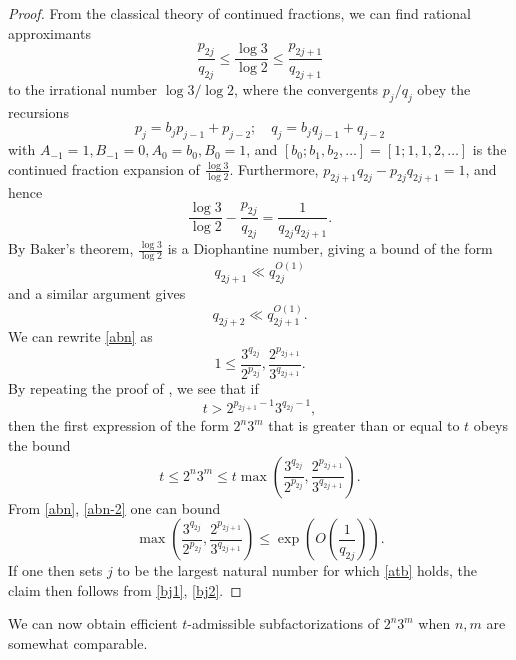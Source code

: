 \documentclass[12pt,a4paper,reqno]{amsart}
\numberwithin{equation}{section}
\theoremstyle{plain}
\theoremstyle{definition}
\begin{document}
\begin{proof}  From the classical theory of continued fractions, we can find rational approximants
\begin{equation}\label{abn}
 \frac{p_{2j}}{q_{2j}} \leq \frac{\log 3}{\log 2} \leq \frac{p_{2j+1}}{q_{2j+1}}
\end{equation}
to the irrational number $\log 3/\log 2$, where the convergents $p_j/q_j$ obey the recursions
$$ p_j = b_j p_{j-1} + p_{j-2}; \quad q_j = b_j q_{j-1} + q_{j-2}$$
with $A_{-1} = 1, B_{-1}=0, A_0 = b_0, B_0=1$, and $[b_0;b_1,b_2,\dots] = [1;1,1,2,\dots]$ is the continued fraction expansion of $\frac{\log 3}{\log 2}$.  Furthermore, $p_{2j+1}q_{2j} - p_{2j} q_{2j+1} = 1$, and hence
\begin{equation}\label{abn-2} 
  \frac{\log 3}{\log 2} - \frac{p_{2j}}{q_{2j}} = \frac{1}{q_{2j} q_{2j+1}}.
\end{equation}
By Baker's theorem, $\frac{\log 3}{\log 2}$ is a Diophantine number, giving a bound of the form
\begin{equation}\label{bj1}
   q_{2j+1} \ll q_{2j}^{O(1)}
\end{equation}
and a similar argument gives
\begin{equation}\label{bj2}
 q_{2j+2} \ll q_{2j+1}^{O(1)}.
\end{equation}
We can rewrite \eqref{abn} as
$$ 1 \leq \frac{3^{q_{2j}}}{2^{p_{2j}}}, \frac{2^{p_{2j+1}}}{3^{q_{2j+1}}}.$$
By repeating the proof of , we see that if
\begin{equation}\label{atb}
   t > 2^{p_{2j+1}-1} 3^{q_{2j}-1},
\end{equation}
then the first expression of the form $2^n 3^m$ that is greater than or equal to $t$ obeys the bound
$$ t \leq 2^n 3^m \leq t \max\left( \frac{3^{q_{2j}}}{2^{p_{2j}}}, \frac{2^{p_{2j+1}}}{3^{q_{2j+1}}} \right).$$
From \eqref{abn},  \eqref{abn-2} one can bound
$$ \max\left( \frac{3^{q_{2j}}}{2^{p_{2j}}}, \frac{2^{p_{2j+1}}}{3^{q_{2j+1}}} \right) \leq \exp\left( O\left( \frac{1}{q_{2j}}\right)\right).$$
If one then sets $j$ to be the largest natural number for which \eqref{atb} holds, the claim then follows from \eqref{bj1}, \eqref{bj2}.
\end{proof}


We can now obtain efficient $t$-admissible subfactorizations of $2^n 3^m$ when $n,m$ are somewhat comparable.
\end{document}
